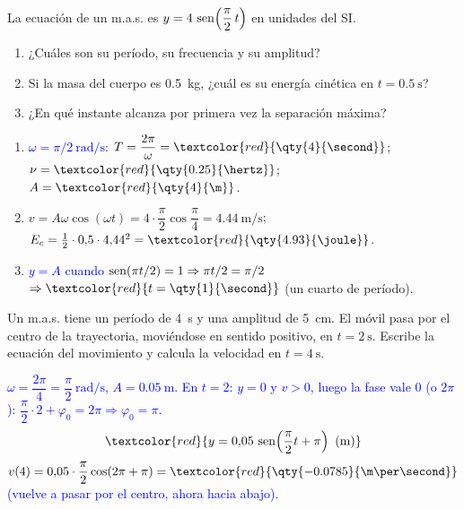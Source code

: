 \begin{exercise}
    La ecuación de un m.a.s. es \(y = 4\,\operatorname{sen}\!\left(\dfrac{\pi}{2}\,t\right)\) en unidades del SI.
    \begin{enumerate}[label=\letraminuscula]
        \item ¿Cuáles son su período, su frecuencia y su amplitud?
        \item Si la masa del cuerpo es \qty{0.5}{\kg}, ¿cuál es su energía cinética en \(t = \qty{0.5}{\second}\)?
        \item ¿En qué instante alcanza por primera vez la separación máxima?
    \end{enumerate}
    \begin{solu}
        \begin{enumerate}[label=\letraminuscula]
            \item \textcolor{blue}{\(\omega = \pi/2\ \unit{\radian\per\second}\):} \(T = \dfrac{2\pi}{\omega} = \textcolor{red}{\qty{4}{\second}}\);
            \(\nu = \textcolor{red}{\qty{0.25}{\hertz}}\); \(A = \textcolor{red}{\qty{4}{\m}}\).
            \item \(v = A\omega\cos(\omega t) = 4\cdot\dfrac{\pi}{2}\cos\dfrac{\pi}{4} = \qty{4.44}{\m\per\second}\);
            \(E_c = \frac{1}{2}\cdot 0{,}5\cdot 4{,}44^2 = \textcolor{red}{\qty{4.93}{\joule}}\).
            \item \textcolor{blue}{\(y = A\) cuando \(\operatorname{sen}(\pi t/2) = 1 \Rightarrow \pi t/2 = \pi/2\)} \(\Rightarrow \textcolor{red}{t = \qty{1}{\second}}\) (un cuarto de período).
        \end{enumerate}
    \end{solu}
\end{exercise}

\begin{exercise}
    Un m.a.s. tiene un período de \qty{4}{\second} y una amplitud de \qty{5}{\cm}. El móvil pasa por el centro de la
    trayectoria, moviéndose en sentido positivo, en \(t = \qty{2}{\second}\). Escribe la ecuación del movimiento y calcula la
    velocidad en \(t = \qty{4}{\second}\).
    \begin{solu}
        \textcolor{blue}{\(\omega = \dfrac{2\pi}{4} = \dfrac{\pi}{2}\ \unit{\radian\per\second}\), \(A = \qty{0.05}{\m}\). En \(t = 2\): \(y = 0\) y \(v > 0\), luego la fase
        vale \(0\) (o \(2\pi\)): \(\dfrac{\pi}{2}\cdot 2 + \varphi_0 = 2\pi \Rightarrow \varphi_0 = \pi\).}
        \[ \textcolor{red}{y = 0{,}05\,\sen\!\left(\dfrac{\pi}{2}t + \pi\right)\ \text{(m)}} \]
        \(v(4) = 0{,}05\cdot\dfrac{\pi}{2}\cos(2\pi + \pi) = \textcolor{red}{\qty{-0.0785}{\m\per\second}}\) \textcolor{blue}{(vuelve a pasar por el centro, ahora hacia abajo).}
    \end{solu}
\end{exercise}


